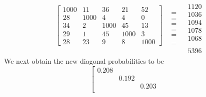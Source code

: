 \begin{example}
\begin{equation}
\begin{array}{*{20}{c}}
{\left[ {\begin{array}{*{20}{c}}
{1000}&{11}&{36}&{21}&{52}\\
{28}&{1000}&4&4&0\\
{34}&2&{1000}&{45}&{13}\\
{29}&1&{45}&{1000}&3\\
{28}&{23}&9&8&{1000}
\end{array}} \right]}\\
{\begin{array}{*{20}{c}}
{}&{}&{}&{}&{}
\end{array}}
\end{array}\begin{array}{*{20}{c}}
{\begin{array}{*{20}{c}}
 = \\
 = \\
 = \\
 = \\
 = 
\end{array}}\\
{\begin{array}{*{20}{c}}
 = 
\end{array}}
\end{array}\begin{array}{*{20}{c}}
{\begin{array}{*{20}{c}}
{1120}\\
{1036}\\
{1094}\\
{1078}\\
{1068}
\end{array}}\\
{\overline {\begin{array}{*{20}{c}}
{5396}
\end{array}} }
\end{array}
\end{equation}
We next obtain the new diagonal probabilities to be
\begin{equation}
\left [ \begin{array}{ccccc}
0.208 & & & & \\
& 0.192 & & &\\
& & 0.203 & & \\

\end{array}
\end{equation}
\end{example}
